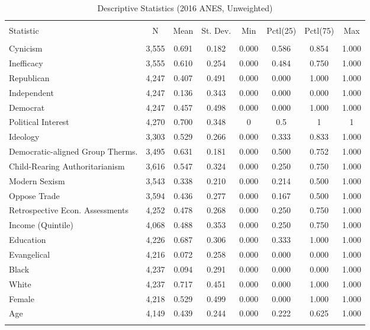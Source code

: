 \begin{table}[!h] \centering 
  \caption{Descriptive Statistics (2016 ANES, Unweighted)} 
  \label{tab:desc-2016} 
\begin{adjustbox}{width=\linewidth,center}
\begin{tabular}{@{\extracolsep{5pt}}lccccccc} 
\\[-1.8ex]\hline
\hline \\[-1.8ex] 
Statistic & \multicolumn{1}{c}{N} & \multicolumn{1}{c}{Mean} & \multicolumn{1}{c}{St. Dev.} & \multicolumn{1}{c}{Min} & \multicolumn{1}{c}{Pctl(25)} & \multicolumn{1}{c}{Pctl(75)} & \multicolumn{1}{c}{Max} \\ 
\hline \\[-1.8ex] 
Cynicism & 3,555 & 0.691 & 0.182 & 0.000 & 0.586 & 0.854 & 1.000 \\ 
Inefficacy & 3,555 & 0.610 & 0.254 & 0.000 & 0.484 & 0.750 & 1.000 \\ 
Republican & 4,247 & 0.407 & 0.491 & 0.000 & 0.000 & 1.000 & 1.000 \\ 
Independent & 4,247 & 0.136 & 0.343 & 0.000 & 0.000 & 0.000 & 1.000 \\ 
Democrat & 4,247 & 0.457 & 0.498 & 0.000 & 0.000 & 1.000 & 1.000 \\ 
Political Interest & 4,270 & 0.700 & 0.348 & 0 & 0.5 & 1 & 1 \\ 
Ideology & 3,303 & 0.529 & 0.266 & 0.000 & 0.333 & 0.833 & 1.000 \\ 
Democratic-aligned Group Therms. & 3,495 & 0.631 & 0.181 & 0.000 & 0.500 & 0.752 & 1.000 \\ 
Child-Rearing Authoritarianism & 3,616 & 0.547 & 0.324 & 0.000 & 0.250 & 0.750 & 1.000 \\ 
Modern Sexism & 3,543 & 0.338 & 0.210 & 0.000 & 0.214 & 0.500 & 1.000 \\ 
Oppose Trade & 3,594 & 0.436 & 0.277 & 0.000 & 0.167 & 0.500 & 1.000 \\ 
Retrospective Econ. Assessments & 4,252 & 0.478 & 0.268 & 0.000 & 0.250 & 0.750 & 1.000 \\ 
Income (Quintile) & 4,068 & 0.488 & 0.353 & 0.000 & 0.250 & 0.750 & 1.000 \\ 
Education & 4,226 & 0.687 & 0.306 & 0.000 & 0.333 & 1.000 & 1.000 \\ 
Evangelical & 4,216 & 0.072 & 0.258 & 0.000 & 0.000 & 0.000 & 1.000 \\ 
Black & 4,237 & 0.094 & 0.291 & 0.000 & 0.000 & 0.000 & 1.000 \\ 
White & 4,237 & 0.717 & 0.451 & 0.000 & 0.000 & 1.000 & 1.000 \\ 
Female & 4,218 & 0.529 & 0.499 & 0.000 & 0.000 & 1.000 & 1.000 \\ 
Age & 4,149 & 0.439 & 0.244 & 0.000 & 0.222 & 0.625 & 1.000 \\ 
\hline \\[-1.8ex] 
\end{tabular} 
\end{adjustbox}
\end{table} 
